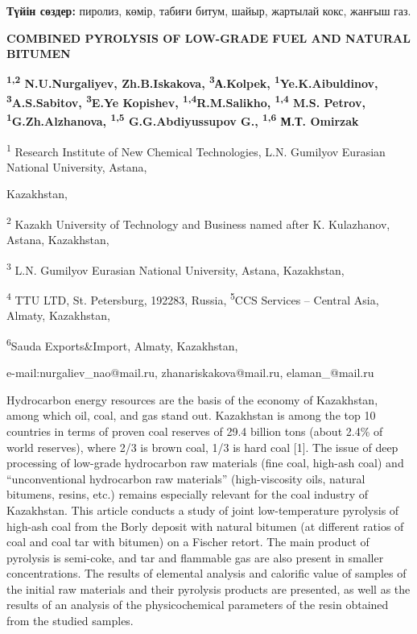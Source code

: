 {\bfseries Түйін сөздер:} пиролиз, көмір, табиғи битум, шайыр, жартылай
кокс, жанғыш газ.

\begin{center}
{\large\bfseries COMBINED PYROLYSIS OF LOW-GRADE FUEL AND NATURAL BITUMEN}

{\bfseries \textsuperscript{1,2} N.U.Nurgaliyev\envelope, Zh.B.Iskakova\envelope,
\textsuperscript{3}А.Kolpek, \textsuperscript{1}Ye.K.Aibuldinov\envelope, \textsuperscript{3}A.S.Sabitov, \textsuperscript{3}E.Ye Kopishev, \textsuperscript{1,4}R.M.Salikho, \textsuperscript{1,4} M.S. Petrov, \textsuperscript{1}G.Zh.Alzhanova, \textsuperscript{1,5} G.G.Abdiyussupov G., \textsuperscript{1,6}
М.Т. Omirzak}

\textsuperscript{1} Research Institute of New Chemical Technologies,
L.N. Gumilyov Eurasian National University, Astana,

Kazakhstan,

\textsuperscript{2} Kazakh University of Technology and Business named
after K. Kulazhanov, Astana, Kazakhstan,

\textsuperscript{3} L.N. Gumilyov Eurasian National University, Astana,
Kazakhstan,

\textsuperscript{4} TTU LTD, St. Petersburg, 192283, Russia,
\textsuperscript{5}CCS Services -- Central Asia, Almaty, Kazakhstan,

\textsuperscript{6}Sauda Exports\&Import, Almaty, Kazakhstan,

e-mail:nurgaliev\_nao@mail.ru, zhanariskakova@mail.ru, elaman\_@mail.ru
\end{center}

Hydrocarbon energy resources are the basis of the economy of Kazakhstan,
among which oil, coal, and gas stand out. Kazakhstan is among the top 10
countries in terms of proven coal reserves of 29.4 billion tons (about
2.4\% of world reserves), where 2/3 is brown coal, 1/3 is hard coal
{[}1{]}. The issue of deep processing of low-grade hydrocarbon raw
materials (fine coal, high-ash coal) and ``unconventional hydrocarbon
raw materials'' (high-viscosity oils, natural bitumens, resins, etc.)
remains especially relevant for the coal industry of Kazakhstan. This
article conducts a study of joint low-temperature pyrolysis of high-ash
coal from the Borly deposit with natural bitumen (at different ratios of
coal and coal tar with bitumen) on a Fischer retort. The main product of
pyrolysis is semi-coke, and tar and flammable gas are also present in
smaller concentrations. The results of elemental analysis and calorific
value of samples of the initial raw materials and their pyrolysis
products are presented, as well as the results of an analysis of the
physicochemical parameters of the resin obtained from the studied
samples.

